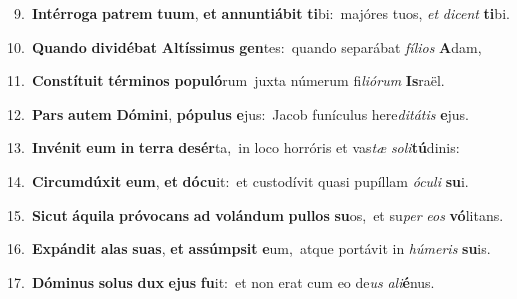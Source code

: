 {{\numbfont\textcolor{\numbcolor}{~9.}}~\-\textbf{In}\-\textbf{tér}\textbf{ro}\textbf{ga} \textbf{pa}\-\textbf{trem} \textbf{tu}\-\textbf{um}, \textbf{et} \textbf{an}\-\textbf{nun}\textbf{ti}\textbf{á}\textbf{bit} \textbf{ti}\-bi:~\star majóres tuos, \textit{et} \textit{di}\-\textit{cent} \textbf{ti}\-bi.\par
{\numbfont\textcolor{\numbcolor}{10.}}~\-\textbf{Quan}\-\textbf{do} \textbf{di}\-\textbf{vi}\textbf{dé}\textbf{bat} \textbf{Al}\-\textbf{tís}\textbf{si}\textbf{mus} \textbf{gen}\-tes:~\star quando separábat \textit{fí}\-\textit{li}\textit{os} \textbf{A}\-dam,\par
{\numbfont\textcolor{\numbcolor}{11.}}~\-\textbf{Con}\-\textbf{stí}\textbf{tu}\textbf{it} \textbf{tér}\-\textbf{mi}\textbf{nos} \textbf{po}\-\textbf{pu}\textbf{ló}rum~\star juxta númerum fi\-\textit{li}\-\textit{ó}\textit{rum} \textbf{Is}\-raël.\par
{\numbfont\textcolor{\numbcolor}{12.}}~\textbf{Pars} \textbf{au}\-\textbf{tem} \textbf{Dó}\-\textbf{mi}\textbf{ni}, \textbf{pó}\-\textbf{pu}\textbf{lus} \textbf{e}\-jus:~\star Jacob funículus here\-\textit{di}\-\textit{tá}\textit{tis} \textbf{e}\-jus.\par
{\numbfont\textcolor{\numbcolor}{13.}}~\-\textbf{In}\-\textbf{vé}\textbf{nit} \textbf{e}\-\textbf{um} \textbf{in} \textbf{ter}\-\textbf{ra} \textbf{de}\-\textbf{sér}ta,~\star in loco horróris et vas\textit{tæ} \textit{so}\-\textit{li}\textbf{tú}dinis:\par
{\numbfont\textcolor{\numbcolor}{14.}}~\-\textbf{Cir}\-\textbf{cum}\textbf{dú}\textbf{xit} \textbf{e}\-\textbf{um}, \textbf{et} \textbf{dó}\-\textbf{cu}it:~\star et custodívit quasi pupíllam \textit{ó}\-\textit{cu}\textit{li} \textbf{su}\-i.\par
{\numbfont\textcolor{\numbcolor}{15.}}~\-\textbf{Sic}\-\textbf{ut} \textbf{á}\-\textbf{qui}\textbf{la} \textbf{pró}\-\textbf{vo}\textbf{cans} \textbf{ad} \textbf{vo}\-\textbf{lán}\textbf{dum} \textbf{pul}\-\textbf{los} \textbf{su}\-os,~\star et su\textit{per} \textit{e}\-\textit{os} \textbf{vó}\-litans.\par
{\numbfont\textcolor{\numbcolor}{16.}}~\-\textbf{Ex}\-\textbf{pán}\textbf{dit} \textbf{a}\-\textbf{las} \textbf{su}\-\textbf{as}, \textbf{et} \textbf{as}\-\textbf{súmp}\textbf{sit} \textbf{e}\-um,~\star atque portávit in \textit{hú}\-\textit{me}\textit{ris} \textbf{su}\-is.\par
{\numbfont\textcolor{\numbcolor}{17.}}~\-\textbf{Dó}\-\textbf{mi}\textbf{nus} \textbf{so}\-\textbf{lus} \textbf{dux} \textbf{e}\-\textbf{jus} \textbf{fu}\-it:~\star et non erat cum eo de\textit{us} \textit{a}\-\textit{li}\textbf{é}nus.\par
}
